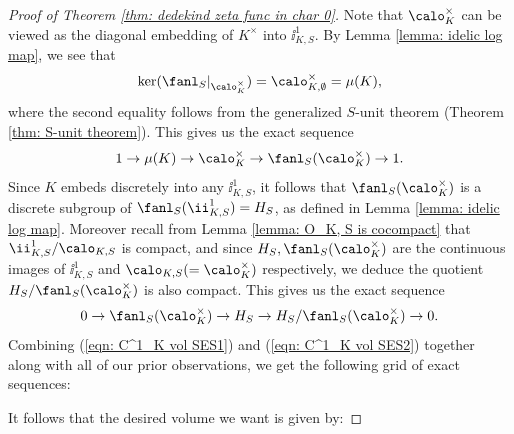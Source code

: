 \documentclass[11pt, x11names, openany]{book}
\begin{document}
\begin{proof}[Proof of Theorem \ref{thm: dedekind zeta func in char 0}]
Note that $\calo_K^\times$ can be viewed as the diagonal embedding of $K^\times$ into $\ii^1_{K, S}$. By Lemma \ref{lemma: idelic log map}, we see that
\begin{equation*}
    \ker(\fanl_{S} \vert_{\calo_K^\times}) = \calo_{K, \emptyset}^\times = \mu(K),
\end{equation*}
where the second equality follows from the generalized $S$-unit theorem (Theorem \ref{thm: S-unit theorem}). This gives us the exact sequence
\begin{equation}
    \label{eqn: C^1_K vol SES1}
    1 \to \mu(K) \to \calo_K^\times \to \fanl_{S}(\calo_K^\times) \to 1.
\end{equation}
Since $K$ embeds discretely into any $\ii^1_{K, S}$, it follows that $\fanl_S(\calo_K^\times)$ is a discrete subgroup of $\fanl_{S}(\ii^1_{K, S}) = H_S$, as defined in Lemma \ref{lemma: idelic log map}. Moreover recall from Lemma \ref{lemma: O_K, S is cocompact} that $\ii^1_{K, S}/\calo_{K, S}$ is compact, and since $H_S, \fanl_S(\calo_K^\times)$ are the continuous images of $\ii^1_{K, S}$ and $\calo_{K, S} (= \calo_K^\times)$ respectively, we deduce the quotient $H_S/ \fanl_S(\calo_K^\times)$ is also compact. This gives us the exact sequence
\begin{equation}
    \label{eqn: C^1_K vol SES2}
    0 \to \fanl_S(\calo_K^\times) \to H_S \to H_S/\fanl_S(\calo_K^\times) \to 0.
\end{equation}
Combining (\ref{eqn: C^1_K vol SES1}) and (\ref{eqn: C^1_K vol SES2}) together along with all of our prior observations, we get the following grid of exact sequences:
\begin{center}
\end{center}
It follows that the desired volume we want is given by:

\end{proof}
\end{document}
